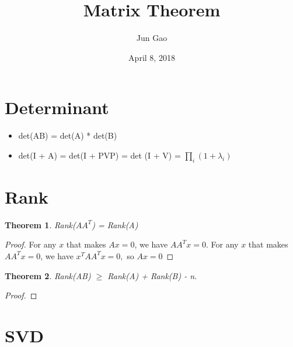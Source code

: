 \documentclass[12pt]{article}
\newtheorem{theorem}{Theorem}[section]
\begin{document}
 
\title{Matrix Theorem}
\author{Jun Gao}
\date{April 8, 2018}

\maketitle
\section{Determinant}
\begin{itemize}
\item det(AB) = det(A) * det(B)
\item det(I + A) = det(I + PVP) = det (I + V) = $\prod_i (1 + \lambda_i)$
\end{itemize}
 

\section{Rank}
\begin{theorem}
	Rank($AA^T$) = Rank(A)
\end{theorem}
\begin{proof}
	For any $x$ that makes $Ax=0$, we have $AA^Tx=0$. For any $x$ that makes $AA^Tx=0$, we have $x^TAA^Tx=0,$ so $Ax=0$
\end{proof}
\begin{theorem}
	Rank(AB) $\ge$ Rank(A) + Rank(B) - n.
\end{theorem}
\begin{proof}
	
\end{proof}
\section{SVD}
\end{document}
